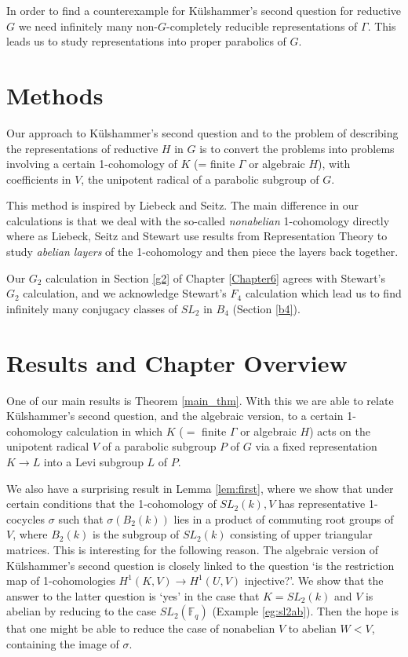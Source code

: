 In order to find a counterexample for K\"ulshammer's second question for reductive $G$ we need infinitely many non-$G$-completely reducible representations of $\Gamma$. This leads us to study representations into proper parabolics of $G$.

\section{Methods}

Our approach to K\"ulshammer's second question and to the problem of describing the representations of reductive $H$ in $G$ is to convert the problems into problems involving a certain 1-cohomology of $K$ (= finite $\Gamma$ or algebraic $H$), with coefficients in $V$, the unipotent radical of a parabolic subgroup of $G$.

This method is inspired by Liebeck and Seitz.
The main difference in our calculations is that we deal with the so-called \emph{nonabelian} 1-cohomology directly where as Liebeck, Seitz and Stewart use results from Representation Theory to study \emph{abelian layers} of the 1-cohomology and then piece the layers back together.

Our $G_2$ calculation in Section \ref{g2} of Chapter \ref{Chapter6} agrees with Stewart's $G_2$ calculation, and we acknowledge Stewart's $F_4$ calculation which lead us to find infinitely many conjugacy classes of $SL_2$ in $B_4$ (Section \ref{b4}).

\section{Results and Chapter Overview}

One of our main results is Theorem \ref{main_thm}. With this we are able to relate K\"ulshammer's second question, and the algebraic version, to a certain 1-cohomology calculation in which $K$ ($=$ finite $\Gamma$ or algebraic $H$) acts on the unipotent radical $V$ of a parabolic subgroup $P$ of $G$ via a fixed representation $K \rightarrow L$ into a Levi subgroup $L$ of $P$.

We also have a surprising result in Lemma \ref{lem:first}, where we show that under certain conditions that the 1-cohomology of $SL_2(k), V$ has representative 1-cocycles $\sigma$ such that $\sigma(B_2(k))$ lies in a product of commuting root groups of $V$, where $B_2(k)$ is the subgroup of $SL_2(k)$ consisting of upper triangular matrices. This is interesting for the following reason. The algebraic version of K\"ulshammer's second question is closely linked to the question `is the restriction map of 1-cohomologies $H^1(K, V)\rightarrow H^1(U,V)$ injective?'.
We show that the answer to the latter question is `yes' in the case that $K=SL_2(k)$ and $V$ is abelian by reducing to the case $SL_2(\mathbb{F}_q)$ (Example \ref{eg:sl2ab}). Then the hope is that one might be able to reduce the case of nonabelian $V$ to abelian $W<V$, containing the image of $\sigma$.

